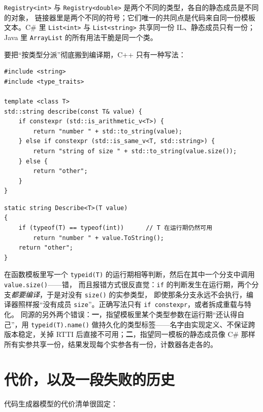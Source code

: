 \documentclass[12pt,a4paper,fontset=fandol]{ctexbook}
\newcommand{\cppxxlabel}[1]{%
  \tcbox[on line,colback=cpp20bg,colframe=cpp20bg,
    boxrule=0pt,arc=1pt,left=2pt,right=2pt,top=1pt,bottom=1pt,
    colupper=white,fontupper=\scriptsize\bfseries]{#1}}
\newcommand{\cpp}[1]{C++#1}
\newcommand{\kw}[1]{\texttt{#1}}
\begin{document}
\kw{Registry<int>} 与 \kw{Registry<double>} 是两个不同的类型，各自的静态成员是不同的对象，
链接器里是两个不同的符号；它们唯一的共同点是代码来自同一份模板文本。C\# 里 \kw{List<int>} 与 \kw{List<string>}
共享同一份 IL、静态成员只有一份；Java 里 \kw{ArrayList} 的所有用法干脆是同一个类。

\cppxxlabel{C++20} 要把“按类型分派”彻底搬到编译期，\cpp{} 只有一种写法：

\begin{lstlisting}[style=cppstyle,caption={编译期分支裁剪取代运行期类型判断：未选中分支不会被实例化}]
#include <string>
#include <type_traits>

template <class T>
std::string describe(const T& value) {
    if constexpr (std::is_arithmetic_v<T>) {
        return "number " + std::to_string(value);
    } else if constexpr (std::is_same_v<T, std::string>) {
        return "string of size " + std::to_string(value.size());
    } else {
        return "other";
    }
}
\end{lstlisting}

\begin{lstlisting}[style=csharpstyle,caption={同样意图在 C\# 里只能写成运行期判断}]
static string Describe<T>(T value)
{
    if (typeof(T) == typeof(int))      // T 在运行期仍然可用
        return "number " + value.ToString();
    return "other";
}
\end{lstlisting}

\begin{warning}[title={把 C\# 或 Java 的“运行期按 T 分派”直觉搬进 \cpp{}}]
在函数模板里写一个 \kw{typeid(T)} 的运行期相等判断，然后在其中一个分支中调用 \kw{value.size()}——错，
而且报错方式很反直觉：\kw{if} 的判断发生在运行期，两个分支\emph{都要编译}，于是对没有 \kw{size()} 的实参类型，
即使那条分支永远不会执行，编译器照样报“没有成员 \kw{size}”。正确写法只有 \kw{if constexpr}，或者拆成重载与特化。
同源的另外两个错误：\textbf{一}，指望模板里某个类型参数在运行期“还认得自己”，用 \kw{typeid(T).name()}
做持久化的类型标签——名字由实现定义、不保证跨版本稳定，关掉 RTTI 后直接不可用；\textbf{二}，指望同一模板的静态成员像 C\#
那样所有实参共享一份，结果发现每个实参各有一份，计数器各走各的。
\end{warning}

\section{代价，以及一段失败的历史}

代码生成器模型的代价清单很固定：
\end{document}
